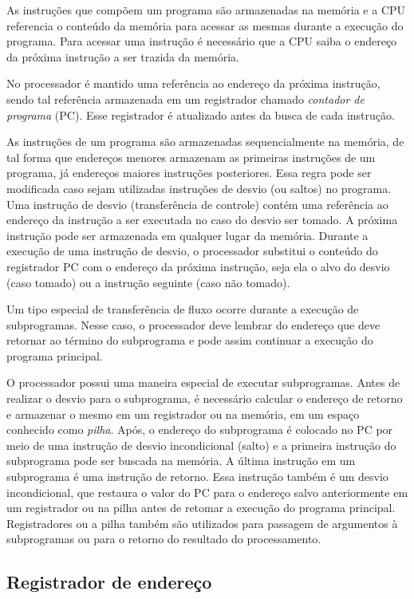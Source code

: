\documentclass[11pt,a4paper]{report}
\begin{document}
As instruções que compõem um programa são armazenadas na memória e a CPU
referencia o conteúdo da memória para acessar as mesmas durante a execução
do programa. Para acessar uma instrução é necessário que a CPU saiba o
endereço da próxima instrução a ser trazida da memória.

No processador é mantido uma referência ao endereço da próxima instrução,
sendo tal referência armazenada em um registrador chamado \textit{contador
de programa} (PC). Esse registrador é atualizado antes da busca de cada
instrução.

As instruções de um programa são armazenadas sequencialmente na memória,
de tal forma que endereços menores armazenam as primeiras instruções de
um programa, já endereços maiores instruções posteriores. Essa regra pode
ser modificada caso sejam utilizadas instruções de desvio (ou saltos) no
programa. Uma instrução de desvio (transferência de controle) contém uma
referência ao endereço da instrução a ser executada no caso do desvio ser
tomado. A próxima instrução pode ser armazenada em qualquer lugar da
memória. Durante a execução de uma instrução de desvio, o processador
substitui o conteúdo do registrador PC com o endereço da próxima
instrução, seja ela o alvo do desvio (caso tomado) ou a instrução
seguinte (caso não tomado).

Um tipo especial de transferência de fluxo ocorre durante a execução
de subprogramas. Nesse caso, o processador deve lembrar do endereço que
deve retornar ao término do subprograma e pode assim continuar a execução
do programa principal.

O processador possui uma maneira especial de executar subprogramas. Antes
de realizar o desvio para o subprograma, é necessário calcular o endereço
de retorno e armazenar o mesmo em um registrador ou na memória, em um
espaço conhecido como \textit{pilha}. Após, o endereço do subprograma
é colocado no PC por meio de uma instrução de desvio incondicional (salto)
e a primeira instrução do subprograma pode ser buscada na memória. A
última instrução em um subprograma é uma instrução de retorno. Essa
instrução também é um desvio incondicional, que restaura o valor do PC
para o endereço salvo anteriormente em um registrador ou na pilha antes
de retomar a execução do programa principal. Registradores ou a pilha
também são utilizados para passagem de argumentos à subprogramas ou para
o retorno do resultado do processamento.

\subsection{Registrador de endereço}
\end{document}
